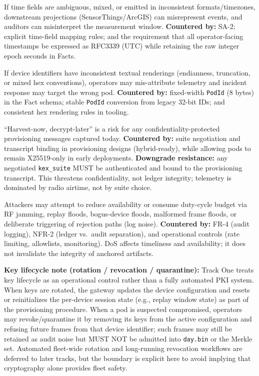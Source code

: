 \begin{description}[style=nextline]
  \item[T-7 Time semantic confusion (phenomenon vs. ingest/result time)] If time fields are ambiguous, mixed, or emitted in inconsistent formats/timezones, downstream projections (SensorThings/Arc\ac{GIS}) can misrepresent events, and auditors can misinterpret the measurement window.
  \textbf{Countered by:} SA-2; explicit time-field mapping rules; and the requirement that all operator-facing timestamps be expressed as \ac{RFC}3339 (\ac{UTC}) while retaining the raw integer epoch seconds in Facts.

  \item[T-8 Identifier ambiguity (PodId formatting)] If device identifiers have inconsistent textual renderings (endianness, truncation, or mixed hex conventions), operators may mis-attribute telemetry and incident response may target the wrong pod.
  \textbf{Countered by:} fixed-width \texttt{PodId} (8 bytes) in the Fact schema; stable \texttt{PodId} conversion from legacy 32-bit IDs; and consistent hex rendering rules in tooling.

  \item[T-9 Crypto agility] ``Harvest-now, decrypt-later'' is a risk for any confidentiality-protected
  provisioning messages captured today.
  \textbf{Countered by:} suite negotiation and transcript binding in provisioning designs (hybrid-ready), while allowing pods to remain X25519-only in early deployments. \textbf{Downgrade resistance:} any negotiated \texttt{kex\_suite} MUST be authenticated and bound to the provisioning transcript.
  This threatens confidentiality, not ledger integrity; telemetry is dominated by radio airtime, not by suite choice.

  \item[T-10 Denial-of-service and resource exhaustion] Attackers may attempt to reduce availability or consume duty-cycle budget via RF jamming, replay floods, bogus-device floods, malformed frame floods, or deliberate triggering of rejection paths (log noise).
  \textbf{Countered by:} FR-4 (audit logging), NFR-2 (ledger vs.\ audit separation), and operational controls (rate limiting, allowlists, monitoring).
  DoS affects timeliness and availability; it does not invalidate the integrity of anchored artifacts.
\end{description}

\textbf{Key lifecycle note (rotation / revocation / quarantine):}
Track One treats key lifecycle as an operational control rather than a fully automated \ac{PKI} system.
When keys are rotated, the gateway updates the device configuration and resets or reinitializes the per-device session state (e.g., replay window state) as part of the provisioning procedure.
When a pod is suspected compromised, operators may revoke/quarantine it by removing its keys from the active configuration and refusing future frames from that device identifier; such frames may still be retained as audit noise but MUST NOT be admitted into \texttt{day.bin} or the Merkle set.
Automated fleet-wide rotation and long-running revocation workflows are deferred to later tracks, but the boundary is explicit here to avoid implying that cryptography alone provides fleet safety.

